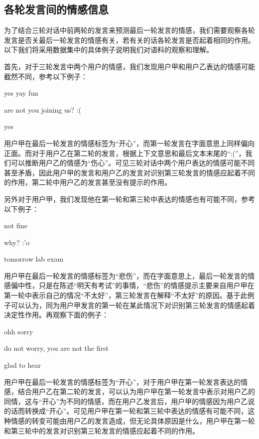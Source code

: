 \subsection{各轮发言间的情感信息}
\label{ssec:exp_context_emo_multi_turn_analyse}

为了结合三轮对话中前两轮的发言来预测最后一轮发言的情感，我们需要观察各轮发言是否关最后一轮发言的情感有关，若有关的话各轮发言是否起着相同的作用。以下我们将采用数据集中的具体例子说明我们对语料的观察和理解。

首先，对于三轮发言中两个用户的情感，我们发现用户甲和用户乙表达的情感可能截然不同，参考以下例子：

 yes yay fun\par
{} are not you joining us? :( \par
{} yes\par

用户甲在最后一轮发言的情感标签为“开心”，而第一轮发言在字面意思上同样偏向正面。而对于用户乙在第二轮的发言，根据上下文意思和最后文本末尾的“:(”，我们可以推断用户乙的情感为“伤心”。可见三轮对话中两个用户表达的情感可能不同甚至矛盾，因此用户甲的发言和用户乙的发言对识别第三轮发言的情感应起着不同的作用，第二轮中用户乙的发言甚至没有提示的作用。

另外对于用户甲，我们发现他在第一轮和第三轮中表达的情感也有可能不同，参考以下例子：

 not fine\par
{} why? :'o \par
{} tomorrow lab exam\par

用户甲在最后一轮发言的情感标签为“悲伤”，而在字面意思上，最后一轮发言的情感偏中性，只是在陈述“明天有考试”的事情，“悲伤”的情感提示主要来自用户甲在第一轮中表示自己的情况“不太好”，第三轮发言在解释“不太好”的原因。基于此例子可以认为，同为用户甲发言的第一轮在某此情况下对识别第三轮发言的情感起着决定性作用。再观察下面的例子：

 ohh sorry\par
{} do not worry, you are not the first \par
{} glad to hear\par

用户甲在最后一轮发言的情感标签为“开心”，对于用户甲在第一轮发言表达的情感，结合用户乙在第二轮的发言，可以认为用户甲在第一轮发言中表示对用户乙的同情，这与“开心”为不同的情感，而在用户乙发言后，用户甲的情感因为用户乙说的话而转换成“开心”。可见用户甲在第一轮和第三轮中表达的情感有可能不同，这种情感的转变可能由用户乙的发言造成，但无论具体原因是什么，用户甲在第一轮和第三轮中的发言对识别第三轮发言的情感应起着不同的作用。

